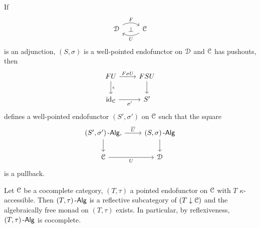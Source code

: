 \documentclass[a4paper,11pt,oneside,openany]{scrbook}
\begin{document}
\begin{prop}
	If
	\begin{displaymath}
		\begin{tikzcd}
			\D \arrow[r, "F", shift left=.1em, bend left=30]
			\arrow[from=r, "U", shift left=.1em, bend left=30]
			\arrow[r, phantom, "\bot"]
			& \C
		\end{tikzcd}
	\end{displaymath}
	is an adjunction, $ (S,\sigma) $ is a well-pointed endofunctor on $ \operatorname{\mathcal{D}} $
	and $ \operatorname{\mathcal{C}} $ has pushouts, then
	\begin{displaymath}
		\begin{tikzcd}
			FU \arrow[r,"F\sigma U"]\arrow[d, "\epsilon"]& FSU \arrow[d]\\
			\id_{\C} \arrow[r, "\sigma'"']& S'
		\end{tikzcd}
	\end{displaymath}
	defines a well-pointed endofunctor $ (S',\sigma') $ on $ \operatorname{\mathcal{C}} $ such that the square
	\begin{displaymath}
		\begin{tikzcd}
			(S',\sigma')\Alg \arrow[r, "\overline U"],\arrow[d]
			& (S,\sigma)\Alg \arrow[d]\\
			\C \arrow[r, "U"'] & \D
		\end{tikzcd}
	\end{displaymath}
	is a pullback.\hfill\qedsymbol
\end{prop}
\begin{thm}
	Let $ \operatorname{\mathcal{C}} $ be a cocomplete category, $ (T,\tau) $ a pointed endofunctor on $
    \operatorname{\mathcal{C}} $ with $ T $ $ \kappa $-accessible.
	Then $ (T,\tau)\operatorname{-\mathsf{Alg}} $ is a reflective subcategory of $ (T\downarrow\operatorname{\mathcal{C}})$ and
    the algebraically free monad on $ (T,\tau) $ exists. In particular, by
    reflexiveness, $ (T,\tau)\operatorname{-\mathsf{Alg}} $ is cocomplete.
\end{thm}
\end{document}

